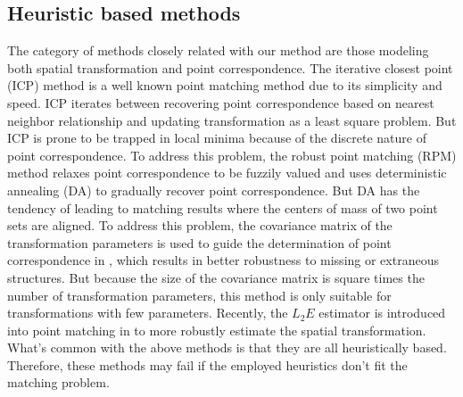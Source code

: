 \documentclass[11pt,bezier,]{article}
\begin{document}
\subsection{Heuristic based methods} 
The  category  of methods closely related with our method 
are those modeling both spatial transformation and point correspondence.
The  iterative closest point (ICP) method \cite{ICP,ICP2} 
is a well known  point matching method due to its simplicity and speed.
ICP  iterates between recovering  point correspondence based on  nearest neighbor relationship and
updating transformation as a least square problem.
But ICP is prone to be trapped in local minima 
because of  the discrete nature of point correspondence.
To address this problem,
the robust point matching (RPM) method \cite{RPM_TPS} 
relaxes point correspondence to be fuzzily   valued and
uses deterministic annealing (DA) to gradually recover point correspondence.
But  DA has the tendency of leading to  matching results
where the centers of mass of two point sets are aligned.
To address this problem,
the covariance matrix of the transformation parameters is used to
guide the determination of point correspondence in \cite{CDC},
which results in  better robustness to missing or extraneous structures.
But because the size of the covariance matrix is square times the number of transformation parameters,
this method is only suitable for transformations with few parameters.
Recently, the $L_2E$ estimator is introduced into point matching in \cite{L2E_mismatch}
to more robustly estimate the spatial transformation.
What's  common  with the above methods is that they are all heuristically based.
Therefore,  these methods may fail if the employed heuristics don't fit the matching problem.
\end{document}
